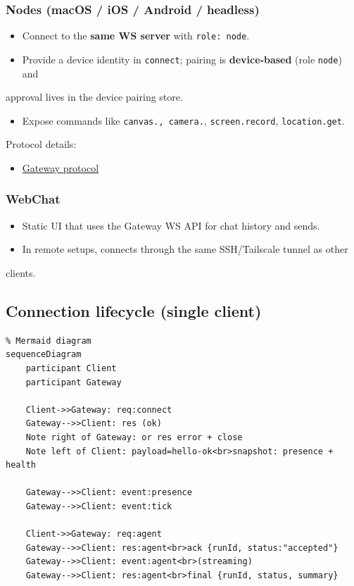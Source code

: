 \subsubsection{Nodes (macOS / iOS / Android / headless)}


\begin{itemize}
  \item Connect to the \textbf{same WS server} with \texttt{role: node}.
  \item Provide a device identity in \texttt{connect}; pairing is \textbf{device‑based} (role \texttt{node}) and
\end{itemize}

approval lives in the device pairing store.
\begin{itemize}
  \item Expose commands like \texttt{canvas.\textit{}, \texttt{camera.}}, \texttt{screen.record}, \texttt{location.get}.
\end{itemize}


Protocol details:

\begin{itemize}
  \item \href{/gateway/protocol}{Gateway protocol}
\end{itemize}


\subsubsection{WebChat}


\begin{itemize}
  \item Static UI that uses the Gateway WS API for chat history and sends.
  \item In remote setups, connects through the same SSH/Tailscale tunnel as other
\end{itemize}

clients.

\subsection{Connection lifecycle (single client)}


\begin{verbatim}
% Mermaid diagram
sequenceDiagram
    participant Client
    participant Gateway

    Client->>Gateway: req:connect
    Gateway-->>Client: res (ok)
    Note right of Gateway: or res error + close
    Note left of Client: payload=hello-ok<br>snapshot: presence + health

    Gateway-->>Client: event:presence
    Gateway-->>Client: event:tick

    Client->>Gateway: req:agent
    Gateway-->>Client: res:agent<br>ack {runId, status:"accepted"}
    Gateway-->>Client: event:agent<br>(streaming)
    Gateway-->>Client: res:agent<br>final {runId, status, summary}
\end{verbatim}



